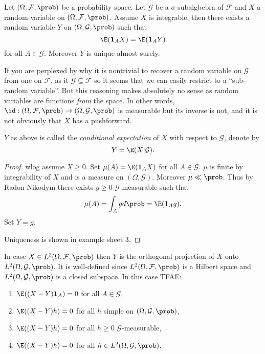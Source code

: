 \documentclass[a4paper]{article}
\renewcommand{\P}{\prob} %
\begin{document}
\begin{proposition}
  Let \((\Omega, \mathcal F, \P)\) be a probability space. Let \(\mathcal G\) be a \(\sigma\)-subalgbebra of \(\mathcal F\) and \(X\) a random variable on \((\Omega, \mathcal F, \P)\). Assume \(X\) is integrable, then there exists a random variable \(Y\) on \((\Omega, \mathcal G, \P)\) such that
  \[
    \E(\mathbf 1_A X) = \E(\mathbf 1_AY)
  \]
  for all \(A \in \mathcal G\). Moreover \(Y\) is unique almost surely.
\end{proposition}

If you are perplexed by why it is nontrivial to recover a random variable on \(\mathcal G\) from one on \(\mathcal F\), as it \(\mathcal G \subseteq \mathcal F\) so it seems that we can easily restrict to a ``sub-random variable''. But this reasoning makes absolutely no sense as random variables are functions \emph{from} the space. In other words, \(\id: (\Omega, \mathcal F, \P) \to (\Omega, \mathcal G, \P)\) is measurable but its inverse is not, and it is not obviously that \(X\) has a pushforward.

\begin{definition}
  \(Y\) as above is called the \emph{conditional expectation} of \(X\) with respect to \(\mathcal G\), denote by
  \[
    Y = \E(X | \mathcal G).
  \]
\end{definition}

\begin{proof}
  wlog assume \(X \geq 0\). Set \(\mu(A) = \E(\mathbf 1_A X)\) for all \(A \in \mathcal G\). \(\mu\) is finite by integrability of \(X\) and is a measure on \((\Omega, \mathcal G)\). Moreover \(\mu \ll \P\). Thus by Radon-Nikodym there exists \(g \geq 0\) \(\mathcal G\)-measurable such that
  \[
    \mu(A) = \int_A g d\P = \E(\mathbf 1_A g).
  \]
  Set \(Y = g\).

  Uniqueness is shown in example sheet 3.
\end{proof}

\begin{remark}
  In case \(X \in L^2(\Omega, \mathcal F, \P)\) then \(Y\) is the orthogonal projection of \(X\) onto \(L^2(\Omega, \mathcal G, \P)\). It is well-defined since \(L^2(\Omega, \mathcal F, \P)\) is a Hilbert space and \(L^2(\Omega, \mathcal G, \P)\) is a closed subspace. In this case TFAE:
  \begin{enumerate}
  \item \(\E((X - Y) \mathbf 1_A) = 0\) for all \(A \in \mathcal G\),
  \item \(\E((X - Y) h) = 0\) for all \(h\) simple on \((\Omega, \mathcal G, \P)\),
  \item \(\E((X - Y) h) = 0\) for all \(h \geq 0\) \(\mathcal G\)-measurable,
  \item \(\E((X - Y) h) = 0\) for all \(h \in L^2(\Omega, \mathcal G, \P)\).
  \end{enumerate}
\end{remark}
\end{document}
